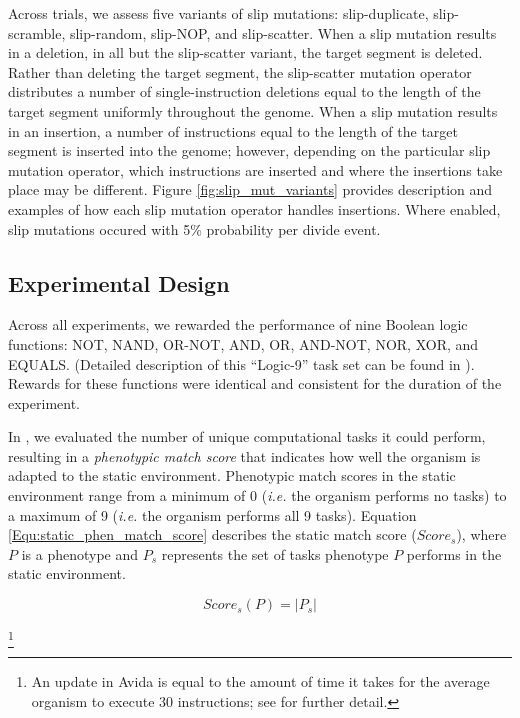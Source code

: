 Across trials, we assess five variants of slip mutations: slip-duplicate, slip-scramble, slip-random, slip-NOP, and slip-scatter.
When a slip mutation results in a deletion, in all but the slip-scatter variant, the target segment is deleted. Rather than deleting the target segment, the slip-scatter mutation operator distributes a number of single-instruction deletions equal to the length of the target segment uniformly throughout the genome.
When a slip mutation results in an insertion, a number of instructions equal to the length of the target segment is inserted into the genome; however, depending on the particular slip mutation operator, which instructions are inserted and where the insertions take place may be different.
Figure \ref{fig:slip_mut_variants} provides description and examples of how each slip mutation operator handles insertions.
Where enabled, slip mutations occured with 5\% probability per divide event.

\subsection{Experimental Design}

Across all experiments, we rewarded the performance of nine Boolean logic functions: NOT, NAND, OR-NOT, AND, OR, AND-NOT, NOR, XOR, and EQUALS.
(Detailed description of this ``Logic-9'' task set can be found in \citet{lenski2003evolutionary}).
Rewards for these functions were identical and consistent for the duration of the experiment.

In , we evaluated the number of unique computational tasks it could perform, resulting in a \textit{phenotypic match score} that indicates how well the organism is adapted to the static environment. Phenotypic match scores in the static environment range from a minimum of 0 (\textit{i.e.} the organism performs no tasks) to a maximum of 9 (\textit{i.e.} the organism performs all 9 tasks). %
Equation \ref{Equ:static_phen_match_score} describes the static match score ($Score_s$), where $P$ is a phenotype and $P_s$ represents the set of tasks phenotype $P$ performs in the static environment.

\begin{equation}
Score_s(P) = |P_{s}|
\label{Equ:static_phen_match_score}
\end{equation}

\footnote{An update in Avida is equal to the amount of time it takes for the average organism to execute 30 instructions; see \citep{Ofria:2009avida} for further detail.}

